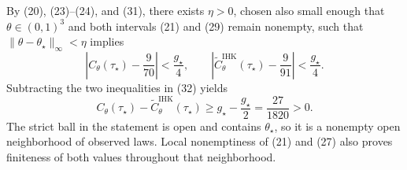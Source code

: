 By (20), (23)--(24), and (31), there exists \(\eta>0\), chosen also small enough that \(\theta\in(0,1)^3\) and both intervals (21) and (29) remain nonempty, such that \(\|\theta-\theta_\star\|_\infty<\eta\) implies
\[
 \left|C_\theta(\tau_\star)-\frac{9}{70}\right|<\frac{g_\star}{4},\qquad
 \left|\widetilde C^{\mathrm{IHK}}_\theta(\tau_\star)-\frac{9}{91}\right|<\frac{g_\star}{4}. \tag{32}
\]
Subtracting the two inequalities in (32) yields
\[
 C_\theta(\tau_\star)-\widetilde C^{\mathrm{IHK}}_\theta(\tau_\star)
 \geq g_\star-\frac{g_\star}{2}
 =\frac{27}{1820}>0. \tag{33}
\]
The strict ball in the statement is open and contains \(\theta_\star\), so it is a nonempty open neighborhood of observed laws.  Local nonemptiness of (21) and (27) also proves finiteness of both values throughout that neighborhood.
